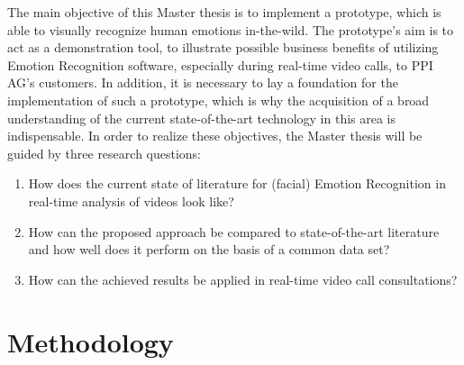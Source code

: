 \documentclass[11pt,a4paper]{scrbook}
\begin{document}
The main objective of this Master thesis is to implement a prototype, which is able to visually recognize human emotions in-the-wild. The prototype's aim is to act as a demonstration tool, to illustrate possible business benefits of utilizing Emotion Recognition software, especially during real-time video calls, to PPI AG's customers.
\newline\newline
In addition, it is necessary to lay a foundation for the implementation of such a prototype, which is why the acquisition of a broad understanding of the current state-of-the-art technology in this area is indispensable.
\newline\newline
In order to realize these objectives, the Master thesis will be guided by three research questions:
\newline
\begin{enumerate}
	\item How does the current state of literature for (facial) Emotion Recognition in real-time analysis of videos look like?
	\item How can the proposed approach be compared to state-of-the-art literature and how well does it perform on the basis of a common data set?
    \item How can the achieved results be applied in real-time video call consultations? 
\end{enumerate}

\chapter{Methodology}

\end{document}
